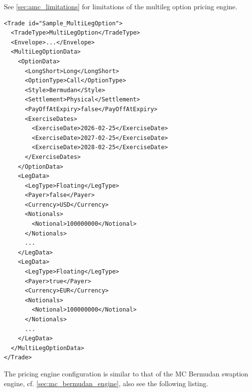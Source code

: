 \documentclass[12pt, a4paper]{article}
\begin{document}
See \ref{sec:amc_limitations} for limitations of the multileg option pricing engine.

\begin{verbatim}
<Trade id="Sample_MultiLegOption">
  <TradeType>MultiLegOption</TradeType>
  <Envelope>...</Envelope>
  <MultiLegOptionData>
    <OptionData>
      <LongShort>Long</LongShort>
      <OptionType>Call</OptionType>
      <Style>Bermudan</Style>
      <Settlement>Physical</Settlement>
      <PayOffAtExpiry>false</PayOffAtExpiry>
      <ExerciseDates>
        <ExerciseDate>2026-02-25</ExerciseDate>
        <ExerciseDate>2027-02-25</ExerciseDate>
        <ExerciseDate>2028-02-25</ExerciseDate>
      </ExerciseDates>
    </OptionData>
    <LegData>
      <LegType>Floating</LegType>
      <Payer>false</Payer>
      <Currency>USD</Currency>
      <Notionals>
        <Notional>100000000</Notional>
      </Notionals>
      ...
    </LegData>
    <LegData>
      <LegType>Floating</LegType>
      <Payer>true</Payer>
      <Currency>EUR</Currency>
      <Notionals>
        <Notional>100000000</Notional>
      </Notionals>
      ...
    </LegData>
  </MultiLegOptionData>
</Trade>
\end{verbatim}

The pricing engine configuration is similar to that of the MC Bermudan swaption engine, cf.
\ref{sec:mc_bermudan_engine}, also see the following listing.
\end{document}
